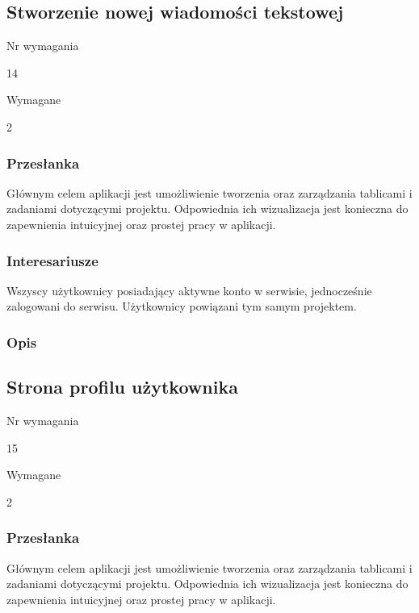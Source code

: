 \documentclass[eng,printmode]{mgr}
\begin{document}
\subsection{Stworzenie nowej wiadomości tekstowej}
\begin{labeling}{Nr wymagania}
\item [Nr wymagania:] 14
\item [Priorytet:] Wymagane
\item [Powiązania:] 2
\end{labeling}

\subsubsection{Przesłanka}
Głównym celem aplikacji jest umożliwienie tworzenia oraz zarządzania tablicami i zadaniami dotyczącymi projektu. Odpowiednia ich wizualizacja jest konieczna do zapewnienia intuicyjnej oraz prostej pracy w aplikacji.

\subsubsection{Interesariusze}
Wszyscy użytkownicy posiadający aktywne konto w serwisie, jednocześnie zalogowani do serwisu. Użytkownicy powiązani tym samym projektem.

\subsubsection{Opis}
\newpage

\subsection{Strona profilu użytkownika}
\begin{labeling}{Nr wymagania}
\item [Nr wymagania:] 15
\item [Priorytet:] Wymagane
\item [Powiązania:] 2
\end{labeling}

\subsubsection{Przesłanka}
Głównym celem aplikacji jest umożliwienie tworzenia oraz zarządzania tablicami i zadaniami dotyczącymi projektu. Odpowiednia ich wizualizacja jest konieczna do zapewnienia intuicyjnej oraz prostej pracy w aplikacji.
\end{document}
